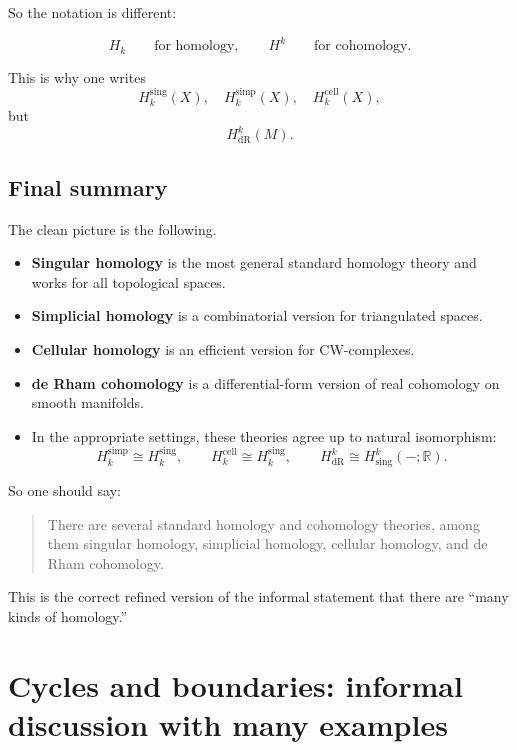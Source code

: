 \documentclass[12pt,a4paper]{article}
\theoremstyle{notespace}
\begin{document}
So the notation is different:

\[
H_k \qquad \text{for homology},
\qquad
H^k \qquad \text{for cohomology}.
\]

This is why one writes
\[
H_k^{\mathrm{sing}}(X),\quad H_k^{\mathrm{simp}}(X),\quad H_k^{\mathrm{cell}}(X),
\]
but
\[
H^k_{\mathrm{dR}}(M).
\]

\subsection{ Final summary}

The clean picture is the following.

\begin{itemize}
	\item \textbf{Singular homology} is the most general standard homology theory and works for all topological spaces.
	
	\item \textbf{Simplicial homology} is a combinatorial version for triangulated spaces.
	
	\item \textbf{Cellular homology} is an efficient version for CW-complexes.
	
	\item \textbf{de Rham cohomology} is a differential-form version of real cohomology on smooth manifolds.
	
	\item In the appropriate settings, these theories agree up to natural isomorphism:
	\[
	H_k^{\mathrm{simp}}\cong H_k^{\mathrm{sing}},
	\qquad
	H_k^{\mathrm{cell}}\cong H_k^{\mathrm{sing}},
	\qquad
	H^k_{\mathrm{dR}}\cong H^k_{\mathrm{sing}}(-;\mathbb R).
	\]
\end{itemize}

So one should say:

\begin{quote}
	There are several standard homology and cohomology theories, among them singular homology, simplicial homology, cellular homology, and de Rham cohomology.
\end{quote}

This is the correct refined version of the informal statement that there are ``many kinds of homology.''

\section{Cycles and boundaries: informal discussion with many examples}
\end{document}
